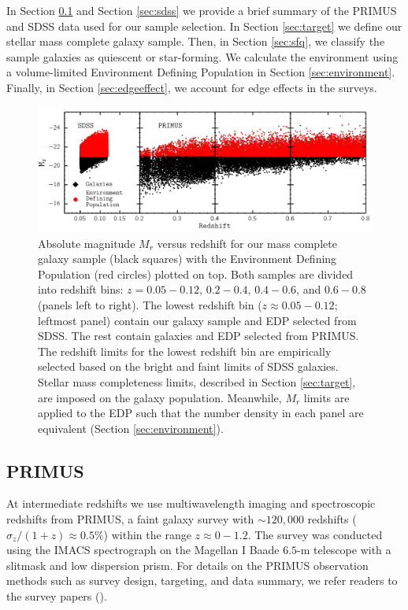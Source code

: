 \documentclass{emulateapj}
\begin{document}
In Section \ref{sec:primus} and Section \ref{sec:sdss} we provide a
brief summary of the PRIMUS and SDSS data used for our sample
selection. In Section \ref{sec:target} we define our stellar mass complete galaxy sample.  
Then, in Section \ref{sec:sfq}, we classify the sample galaxies as quiescent or star-forming. 
We calculate the environment
using a volume-limited Environment Defining Population in Section
\ref{sec:environment}.  Finally, in Section \ref{sec:edgeeffect}, we
account for edge effects in the surveys.

\begin{figure}
    \begin{center}
        \leavevmode
	\includegraphics[scale=0.475]{fig1.pdf}
        \caption{Absolute magnitude $M_{r}$ versus redshift for our mass complete galaxy sample (black squares) with the Environment Defining Population (red circles) plotted on top. Both samples are divided into redshift bins: $z = 0.05-0.12$, $0.2-0.4$, $0.4-0.6$, and $0.6-0.8$ (panels left to right). The lowest redshift bin ($z \approx 0.05-0.12$; leftmost panel) contain our galaxy sample and EDP selected from SDSS. The rest contain galaxies and EDP selected from PRIMUS. The redshift limits for the lowest redshift bin are empirically selected based on the bright and faint limits of SDSS galaxies. Stellar mass completeness limits, described in Section \ref{sec:target}, are imposed on the galaxy population. Meanwhile, $M_{r}$ limits are applied to the EDP such that the number density in each panel are equivalent (Section \ref{sec:environment}).} \label{fig:targetEDP}
    \end{center}
\end{figure}
\subsection{PRIMUS} \label{sec:primus}
At intermediate redshifts we use multiwavelength imaging and
spectroscopic redshifts from PRIMUS, a faint galaxy survey with $\sim
120,000$ redshifts ($\sigma_z/(1+z) \approx 0.5 \%$) within the range
$z \approx 0-1.2$. The survey was conducted using the IMACS
spectrograph on the Magellan I Baade $6.5$-m telescope with a slitmask and low dispersion prism. For details on the PRIMUS observation methods such as survey design, targeting, and data summary, we refer readers to the survey papers (\citealt{Coil:2011aa, Cool:2013aa}). 
\end{document}
